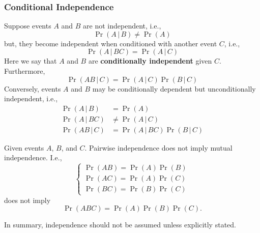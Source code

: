 \documentclass{article}
\begin{document}
\subsubsection{Conditional Independence}
\begin{definition}
    Suppose events \(A\) and \(B\) are not independent, i.e.,
    \begin{equation*}
        \Pr{\left( A \,\vert\, B \right)} \neq \Pr{\left( A \right)}
    \end{equation*}
    but, they become independent when conditioned with another event \(C\), i.e.,
    \begin{equation*}
        \Pr{\left( A \,\vert\, BC \right)} = \Pr{\left( A \,\vert\, C \right)}
    \end{equation*}
    Here we say that \(A\) and \(B\) are \textbf{conditionally independent} given \(C\). Furthermore,
    \begin{equation*}
        \Pr{\left( AB \,\vert\, C \right)} = \Pr{\left( A \,\vert\, C \right)} \Pr{\left( B \,\vert\, C \right)}
    \end{equation*}
    Conversely, events \(A\) and \(B\) may be conditionally dependent but unconditionally independent, i.e.,
    \begin{align*}
        \Pr{\left( A \,\vert\, B \right)}  & = \Pr{\left( A \right)}                                                \\
        \Pr{\left( A \,\vert\, BC \right)} & \neq \Pr{\left( A \,\vert\, C \right)}                                 \\
        \Pr{\left( AB \,\vert\, C \right)} & = \Pr{\left( A \,\vert\, BC \right)} \Pr{\left( B \,\vert\, C \right)}
    \end{align*}
\end{definition}
\begin{theorem}
    Given events \(A\), \(B\), and \(C\). Pairwise independence does not imply mutual independence. I.e.,
    \begin{equation*}
        \begin{cases}
            \Pr{\left( A B \right)} = \Pr{\left( A \right)} \Pr{\left( B \right)} \\
            \Pr{\left( A C \right)} = \Pr{\left( A \right)} \Pr{\left( C \right)} \\
            \Pr{\left( B C \right)} = \Pr{\left( B \right)} \Pr{\left( C \right)}
        \end{cases}
    \end{equation*}
    does not imply
    \begin{equation*}
        \Pr{\left( A B C \right)} = \Pr{\left( A \right)} \Pr{\left( B \right)} \Pr{\left( C \right)}.
    \end{equation*}
\end{theorem}
In summary, independence should not be assumed unless explicitly stated.
\end{document}
